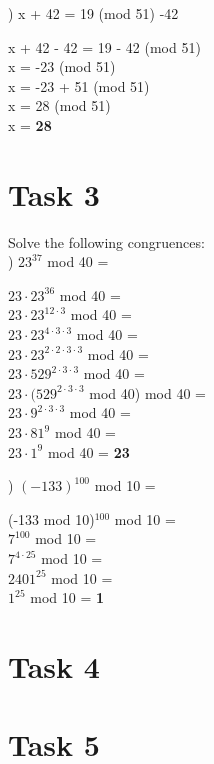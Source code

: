 \documentclass[12pt]{article}
\begin{document}
) x + 42 = 19 (mod 51) \textbar{} -42
\begin{addmargin}[1.22em]{0em}
x + 42 - 42 = 19 - 42 (mod 51) \\
x = -23 (mod 51) \\
x = -23 + 51 (mod 51) \\   
x = 28 (mod 51) \\
x = \textbf{28}
\end{addmargin}


\section*{Task 3} 

Solve the following congruences: \\

) $23^{37}$ mod 40 = 
\begin{addmargin}[1.22em]{0em}
$23 \cdot 23^{36}$ mod 40 = \\
$23 \cdot 23^{12\cdot3}$ mod 40 = \\
$23 \cdot 23^{4\cdot3\cdot3}$ mod 40 = \\
$23 \cdot 23^{2\cdot2\cdot3\cdot3}$ mod 40 = \\
$23 \cdot 529^{2\cdot3\cdot3}$ mod 40 = \\
$23 \cdot (529^{2\cdot3\cdot3}$ mod 40) mod 40 = \\
$23 \cdot 9^{2\cdot3\cdot3}$ mod 40 = \\
$23 \cdot 81^9$ mod 40 = \\
$23 \cdot 1^9$ mod 40 = 
\textbf{23}
\end{addmargin}

\pagebreak

) $(-133)^{100}$ mod 10 = 
\begin{addmargin}[1.22em]{0em}
(-133 mod 10)$^{100}$ mod 10 = \\
$7^{100}$ mod 10 = \\
$7^{4 \cdot 25}$ mod 10 = \\
$2401^{25}$ mod 10 = \\
$1^{25}$ mod 10 = 
\textbf{1}
\end{addmargin}

\section*{Task 4}


\section*{Task 5}
\end{document}
